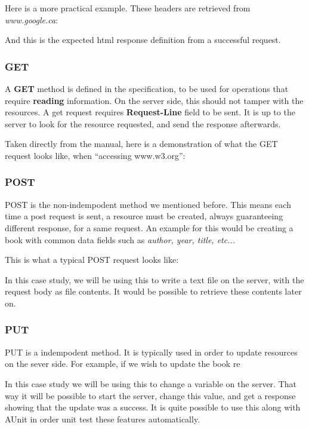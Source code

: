 Here is a more practical example. These headers are retrieved from \textit{www.google.ca}:


And this is the expected html response definition from a successful request.


\subsubsection{GET} 
A \textbf{GET} method is defined in the specification, to be used for operations that require \textbf{reading} information. On the server side, this should not tamper with the resources. 
A get request requires \textbf{Request-Line} field to be sent. It is up to the server to look for the resource requested, and send the response afterwards.

Taken directly from the manual, here is a demonstration of what the GET request looks like, when ``accessing www.w3.org'':


\subsubsection{POST} \label{http:axios-post}
POST is the non-indempodent method we mentioned before. This means each time a post request is sent, a resource must be created, always guaranteeing different response, for a same request. An example for this would be creating a book with common data fields such as \textit{author, year, title, etc...}

This is what a typical POST request looks like:

In this case study, we will be using this to write a text file on the server, with the request body as file contents. It would be possible to retrieve these contents later on. 

\subsubsection{PUT}
PUT is a indempodent method. It is typically used in order to update resources on the sever side. For example, if we wish to update the book re

In this case study we will be using this to change a variable on the server. That way it will be possible to start the server, change this value, and get a response showing that the update was a success. It is quite possible to use this along with AUnit in order unit test these features automatically. 

